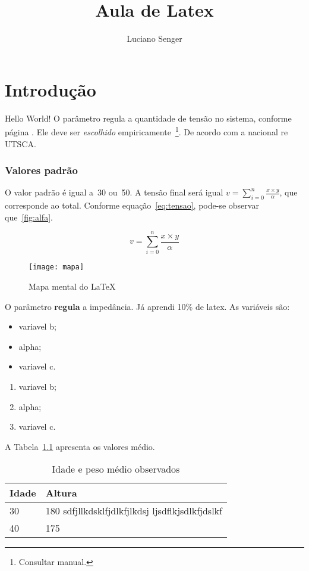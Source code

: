 \documentclass[a4paper, brazil, 12pt , onecolumn]{report}
\title{Aula de Latex}
\author{Luciano Senger}
\begin{document}
	\maketitle
	\tableofcontents
	\listoffigures
	\listoftables
\chapter{Introdução}

Hello World!
O parâmetro  regula a quantidade de tensão no sistema, conforme página \pageref{sec:mat}.
Ele deve ser \textit{escolhido} empiricamente~\footnote{Consultar manual.}.
De acordo com a nacional re \mbox{UTSCA}. 
\subsection{Valores padrão}
O valor padrão é igual a~30 ou~50.
A tensão final será igual $v = \sum_{i=0}^n \frac{x \times y}{\alpha}$, que corresponde ao total.
Conforme equação~\ref{eq:tensao}, pode-se observar que~\ref{fig:alfa}.

\begin{equation}
	v = \sum_{i=0}^n \frac{x \times y}{\alpha}
\end{equation}\label{eq:tensao}

\begin{figure}[htb]
	\centering
	\texttt{[image: mapa]}
	\caption{Mapa mental do \LaTeX}
\end{figure}\label{fig:alfa}

O parâmetro {\Huge {}} \textbf{regula} a impedância.
Já aprendi 10\% de latex.
As variáveis são:
\begin{itemize}
	\item variavel b;
	\item alpha;
	\item variavel c.
\end{itemize}

\begin{enumerate}
	\item variavel b;
	\item alpha;
	\item variavel c.
\end{enumerate}
A Tabela~\ref{tab:idade} apresenta os valores médio.
\begin{table}[htb]
	\caption{Idade e peso médio observados}\label{tab:idade}
	\centering

	\begin{tabularx}{0.9\linewidth}{lX}
		\hline
		\bf Idade & \bf Altura \\ 
		\hline
		30 & 180 sdfjllkdsklfjdlkfjlkdsj ljsdflkjsdlkfjdslkf\\
		40 & 175 \\
		\hline
		\end{tabularx}
\end{table}
\end{document}
